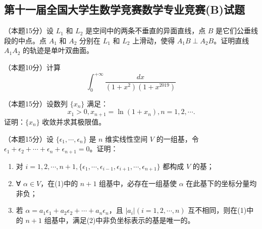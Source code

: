 \documentclass[loose]{ExBook}
\begin{document}
\subsection{第十一届全国大学生数学竞赛数学专业竞赛(B)试题}
\begin{qitems}
    \begin{bbox}
        \qitem （本题15分）设 \( L_1 \) 和 \( L_2 \) 是空间中的两条不垂直的异面直线，点 \( B \) 是它们公垂线段的中点。点 \( A_1 \) 和 \( A_2 \) 分别在 \( L_1 \) 和 \( L_2 \) 上滑动，使得 \( A_1B \perp A_2B \)。证明直线 \( A_1A_2 \) 的轨迹是单叶双曲面。
    \end{bbox}

    \begin{bbox}
        \qitem （本题10分）计算 \[ \int_{0}^{+\infty} \frac{dx}{\left(1+x^2\right)\left(1+x^{2019}\right)} \]
    \end{bbox}

    \begin{bbox}
        \qitem （本题15分）设数列 \(\{x_n\}\) 满足：
        \[ x_1 > 0, x_{n+1} = \ln\left(1+x_n\right), n=1,2,\cdots. \]
        证明：\(\{x_n\}\) 收敛并求其极限值。
    \end{bbox}

    \begin{bbox}
        \qitem （本题15分）设 \(\{\epsilon_1, \cdots, \epsilon_n\}\) 是 \( n \) 维实线性空间 \( V \) 的一组基，令 \(\epsilon_1 + \epsilon_2 + \cdots + \epsilon_n + \epsilon_{n+1} = 0\)。证明：
        \begin{enumerate}[label=(\arabic*)]
            \item 对 \( i = 1,2,\cdots,n+1, \{\epsilon_1, \cdots, \epsilon_{i-1}, \epsilon_{i+1}, \cdots, \epsilon_{n+1}\} \) 都构成 \( V \) 的基；
            \item ∀ \(\alpha \in V\)，在(1)中的 \( n+1 \) 组基中，必存在一组基使 \(\alpha\) 在此基下的坐标分量均非负；
            \item 若 \(\alpha = a_1\epsilon_1 + a_2\epsilon_2 + \cdots + a_n\epsilon_n\)，且 \(\left|a_i\right| (i=1,2,\cdots,n)\) 互不相同，则在(1)中的 \( n+1 \) 组基中，满足(2)中非负坐标表示的基是唯一的。
        \end{enumerate}
    \end{bbox}


\end{qitems}
\end{document}
